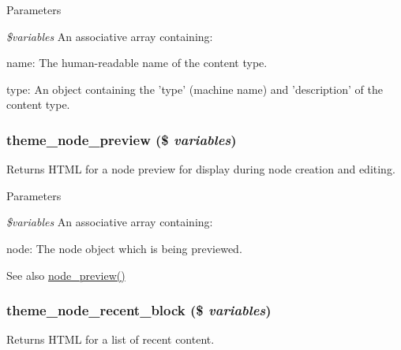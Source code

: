 \begin{DoxyParams}{Parameters}
\item[{\em \$variables}]An associative array containing:
\begin{DoxyItemize}
\item name: The human-\/readable name of the content type.
\item type: An object containing the 'type' (machine name) and 'description' of the content type. 
\end{DoxyItemize}\end{DoxyParams}
\hypertarget{group__themeable_ga1a03fc98e8ba251ec4b971a27b615f09}{
\subsubsection[{theme\_\-node\_\-preview}]{\setlength{\rightskip}{0pt plus 5cm}theme\_\-node\_\-preview (\$ {\em variables})}}
\label{group__themeable_ga1a03fc98e8ba251ec4b971a27b615f09}
Returns HTML for a node preview for display during node creation and editing.


\begin{DoxyParams}{Parameters}
\item[{\em \$variables}]An associative array containing:
\begin{DoxyItemize}
\item node: The node object which is being previewed.
\end{DoxyItemize}\end{DoxyParams}
\begin{DoxySeeAlso}{See also}
\hyperlink{node_8pages_8inc_a774d9df7be341a7c9058555e8cfb4b2b}{node\_\-preview()} 
\end{DoxySeeAlso}
\hypertarget{group__themeable_gabb27be326bca09218e6e44048127c8e3}{
\subsubsection[{theme\_\-node\_\-recent\_\-block}]{\setlength{\rightskip}{0pt plus 5cm}theme\_\-node\_\-recent\_\-block (\$ {\em variables})}}
\label{group__themeable_gabb27be326bca09218e6e44048127c8e3}
Returns HTML for a list of recent content.


